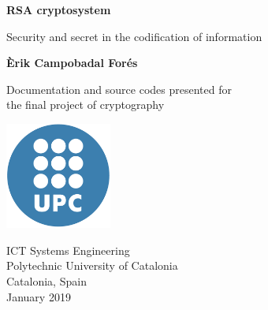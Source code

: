 \begin{titlepage}
    \begin{center}
        \vspace*{1cm}

        \huge
        \textbf{RSA cryptosystem}

        \vspace{0.5cm}

        \Large
        Security and secret in the codification of information

        \vspace{1.5cm}

        \textbf{Èrik Campobadal Forés}

        \vfill

        Documentation and source codes presented for\\
        the final project of cryptography

        \vspace{1cm}

        \includegraphics[height=3.5cm]{upc}

        \vspace{1cm}

        \large
        ICT Systems Engineering\\
        Polytechnic University of Catalonia\\
        Catalonia, Spain\\
        January 2019

    \end{center}
\end{titlepage}
